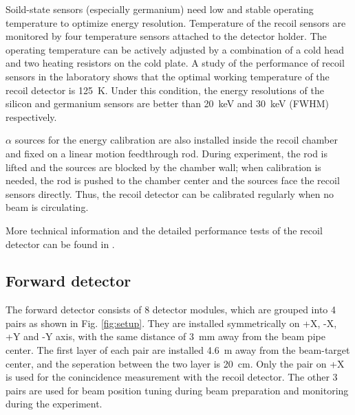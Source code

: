 \documentclass[number,5p]{elsarticle}
\begin{document}
Soild-state sensors (especially germanium) need low and stable operating temperature to optimize energy
resolution.
Temperature of the recoil sensors are monitored by four temperature sensors
attached to the detector holder.
The operating temperature can be actively adjusted by a combination of a cold head and two heating resistors on the cold plate.
A study of the performance of recoil sensors in the laboratory shows that the
optimal working temperature of the recoil detector is \SI{125}{\kelvin}.
Under this condition, the energy resolutions of the silicon and germanium
sensors are better than \SI{20}{\keV} and \SI{30}{\keV} (FWHM) respectively.

$\alpha$ sources for the energy calibration are also installed inside the recoil chamber and fixed on a linear motion feedthrough rod.
During experiment, the rod is lifted and the sources are blocked by the chamber wall;
when calibration is needed, the rod is pushed to the chamber center and the sources face the recoil sensors directly.
Thus, the recoil detector can be calibrated regularly when no beam is circulating.

More technical information and the detailed performance tests of the recoil detector can be found in \cite{recoil_article}.

\subsection{Forward detector}
\label{sec:fwd}


The forward detector consists of 8 detector modules, which are
grouped into 4 pairs as shown in Fig. \ref{fig:setup}.
They are installed symmetrically on +X, -X, +Y and -Y axis, with the same
distance of \SI{3}{\mm} away from the beam pipe center.
The first layer of each pair are installed \SI{4.6}{\meter} away from the
beam-target center, and the seperation between the two layer is \SI{20}{\cm}.
Only the pair on +X is used for the conincidence measurement with the recoil detector.
The other 3 pairs are used for beam position tuning during beam preparation and
monitoring during the experiment.
\end{document}
